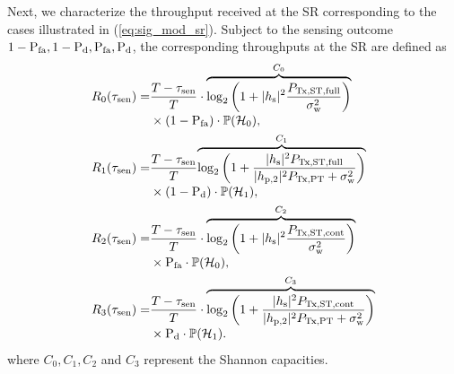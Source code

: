 Next, we characterize the throughput received at the SR corresponding to the cases illustrated in (\ref{eq:sig_mod_sr}). 
Subject to the sensing outcome $1 - \text{P}_{\text{fa}}, 1 - \text{P}_{\text{d}}, \text{P}_{\text{fa}}, \text{P}_{\text{d}}$, the corresponding throughputs at the SR are defined as 
\begin{align}
R_{\text{0}}(\tau_{\text{sen}}) =& \frac{T- \tau_{\text{sen}}}{T} \cdot \smash[b]{\overbrace{\log_2 \left(1 + |h_{\text{s}}|^2 \frac{P_{\text{Tx,ST,full}}}{\sigma^2_{\text{w}}}\right)}^{C_0}} \nonumber \\ 
\quad & \times (1 - \text{P}_{\text{fa}} ) \cdot \mathbb P(\mathcal{H}_0),  \label{eq:Cap0} \\ 
R_{\text{1}}(\tau_{\text{sen}}) =& \frac{T- \tau_{\text{sen}}}{T} \smash[b]{\overbrace{\log_2 \left(1 + \frac{|h_{\text{s}}|^2 P_{\text{Tx,ST,full}} }{|h_{\text{p,2}}|^2 P_{\text{Tx,PT}}  + \sigma^2_{\text{w}}} \right)}^{C_1}} \nonumber \\ 
\quad & \times (1 - \text{P}_{\text{d}}) \cdot \mathbb P(\mathcal{H}_1),  \label{eq:Cap1} \\ 
R_{\text{2}}(\tau_{\text{sen}}) =& \frac{T- \tau_{\text{sen}}}{T} \cdot \smash[b]{\overbrace{\log_2 \left(1 + |h_{\text{s}}|^2 \frac{P_{\text{Tx,ST,cont}}}{\sigma^2_{\text{w}}}\right)}^{C_2}} \nonumber \\ 
\quad & \times \text{P}_{\text{fa}} \cdot \mathbb P(\mathcal{H}_0),  \label{eq:Cap2} \\ 
R_{\text{3}}(\tau_{\text{sen}}) =& \frac{T- \tau_{\text{sen}}}{T} \cdot \smash[b]{\overbrace{\log_2 \left(1 + \frac{|h_{\text{s}}|^2 P_{\text{Tx,ST,cont}} }{|h_{\text{p,2}}|^2 P_{\text{Tx,PT}}  + \sigma^2_{\text{w}}} \right)}^{C_3}}  \nonumber \\   
\quad & \times \text{P}_{\text{d}} \cdot \mathbb P(\mathcal{H}_1).  \label{eq:Cap3}  
\end{align}
where $C_0, C_1, C_2$ and $C_3$ represent the Shannon capacities.


